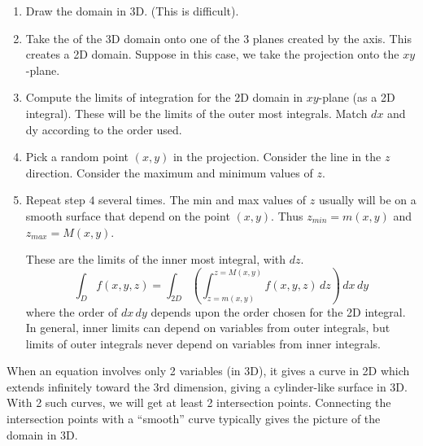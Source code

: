 \begin{enumerate}
    \item Draw the domain in 3D. (This is difficult). 

    \item Take the  of the 3D domain onto one of the 3 planes created by the axis. This creates a 2D domain. Suppose in this case, we take the projection onto the $xy$-plane.
    
    \item Compute the limits of integration for the 2D domain in $xy$-plane (as a 2D integral). These will be the limits of the outer most integrals. Match $dx$ and dy according to the order used. 
    
    \item Pick a random point $(x, y)$ in the projection. Consider the  line in the $z$ direction. Consider the maximum and minimum values of $z$. 
    
    \item Repeat step $4$ several times. The min and max values of $z$ usually will be on a smooth surface that depend on the point $(x, y)$. Thus $z_{min} = m(x, y)$ and $z_{max} = M(x, y)$.
    
    These are the limits of the inner most integral, with $dz$.
    $$\int_D f(x, y, z) = \int_{2D} \left( \int_{z=m(x,y)}^{z=M(x,y)} f(x, y, z) \,dz \right) \,dx \,dy$$
    where the order of $dx \,dy$ depends upon the order chosen for the 2D integral. In general, inner limits can depend on variables from outer integrals, but limits of outer integrals never depend on variables from inner integrals. 
\end{enumerate}

When an equation involves only 2 variables (in 3D), it gives a curve in 2D which extends infinitely toward the 3rd dimension, giving a cylinder-like surface in 3D. With 2 such curves, we will get at least 2 intersection points. Connecting the intersection points with a ``smooth'' curve typically gives the picture of the domain in 3D.

